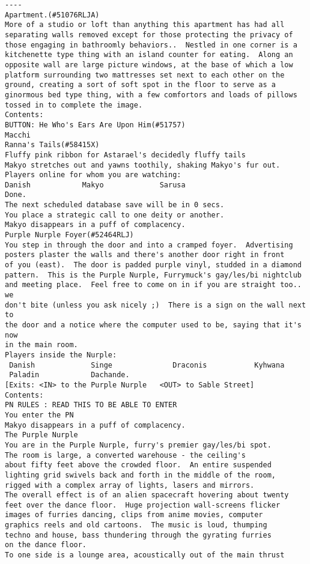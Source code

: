 \begin{verbatim}
----
Apartment.(#51076RLJA)
More of a studio or loft than anything this apartment has had all separating walls removed except for those protecting the privacy of those engaging in bathroomly behaviors..  Nestled in one corner is a kitchenette type thing with an island counter for eating.  Along an opposite wall are large picture windows, at the base of which a low platform surrounding two mattresses set next to each other on the ground, creating a sort of soft spot in the floor to serve as a ginormous bed type thing, with a few comfortors and loads of pillows tossed in to complete the image.
Contents:
BUTTON: He Who's Ears Are Upon Him(#51757)
Macchi
Ranna's Tails(#58415X)
Fluffy pink ribbon for Astarael's decidedly fluffy tails
Makyo stretches out and yawns toothily, shaking Makyo's fur out.
Players online for whom you are watching:
Danish            Makyo             Sarusa            
Done.
The next scheduled database save will be in 0 secs.
You place a strategic call to one deity or another.
Makyo disappears in a puff of complacency.
Purple Nurple Foyer(#52464RLJ)
You step in through the door and into a cramped foyer.  Advertising
posters plaster the walls and there's another door right in front
of you (east).  The door is padded purple vinyl, studded in a diamond
pattern.  This is the Purple Nurple, Furrymuck's gay/les/bi nightclub
and meeting place.  Feel free to come on in if you are straight too.. we
don't bite (unless you ask nicely ;)  There is a sign on the wall next to
the door and a notice where the computer used to be, saying that it's now
in the main room.
Players inside the Nurple:
 Danish             Singe              Draconis           Kyhwana
 Paladin            Dachande.         
[Exits: <IN> to the Purple Nurple   <OUT> to Sable Street]
Contents:
PN RULES : READ THIS TO BE ABLE TO ENTER
You enter the PN
Makyo disappears in a puff of complacency.
The Purple Nurple
You are in the Purple Nurple, furry's premier gay/les/bi spot.  
The room is large, a converted warehouse - the ceiling's
about fifty feet above the crowded floor.  An entire suspended
lighting grid swivels back and forth in the middle of the room,
rigged with a complex array of lights, lasers and mirrors.  
The overall effect is of an alien spacecraft hovering about twenty
feet over the dance floor.  Huge projection wall-screens flicker
images of furries dancing, clips from anime movies, computer
graphics reels and old cartoons.  The music is loud, thumping
techno and house, bass thundering through the gyrating furries
on the dance floor.
To one side is a lounge area, acoustically out of the main thrust

\end{verbatim}
